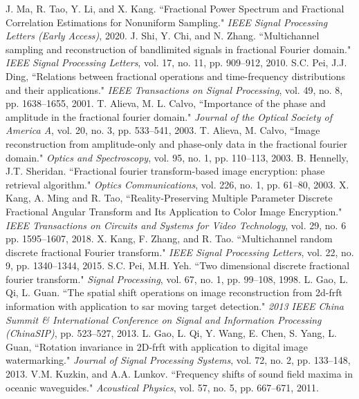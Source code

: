\documentclass[journal]{IEEEtran}
\begin{document}
\begin{thebibliography}{1}
J. Ma, R. Tao, Y. Li, and X. Kang. ``Fractional Power Spectrum and Fractional Correlation Estimations for Nonuniform Sampling." \emph{IEEE Signal Processing Letters (Early Access)}, 2020.
J. Shi, Y. Chi, and N. Zhang. ``Multichannel sampling and reconstruction of bandlimited signals in fractional Fourier domain." \emph{IEEE Signal Processing Letters}, vol. 17, no. 11, pp. 909--912, 2010.
S.C. Pei, J.J. Ding, ``Relations between fractional operations and time-frequency distributions and their applications." \emph{IEEE Transactions on Signal Processing}, vol. 49, no. 8, pp. 1638--1655, 2001.
T. Alieva, M. L. Calvo, ``Importance of the phase and amplitude in the fractional fourier domain." \emph{Journal of the Optical Society of America A}, vol. 20, no. 3, pp. 533--541, 2003.
T. Alieva, M. Calvo, ``Image reconstruction from amplitude-only and phase-only data in the fractional fourier domain." \emph{Optics and Spectroscopy}, vol.  95, no. 1, pp. 110--113, 2003.
B. Hennelly, J.T. Sheridan. ``Fractional fourier transform-based image encryption: phase retrieval algorithm." \emph{Optics Communications}, vol. 226, no. 1, pp. 61--80, 2003.
X. Kang, A. Ming and R. Tao, ``Reality-Preserving Multiple Parameter Discrete Fractional Angular Transform and Its Application to Color Image Encryption." \emph{IEEE Transactions on Circuits and Systems for Video Technology}, vol. 29, no. 6 pp. 1595--1607, 2018.
X. Kang, F. Zhang, and R. Tao. ``Multichannel random discrete fractional Fourier transform." \emph{IEEE Signal Processing Letters}, vol. 22, no. 9, pp. 1340--1344, 2015.
S.C. Pei, M.H. Yeh. ``Two dimensional discrete fractional fourier transform." \emph{Signal Processing}, vol. 67, no. 1, pp. 99--108, 1998.
L. Gao, L. Qi, L. Guan. ``The spatial shift operations on image reconstruction from 2d-frft information with application to sar moving target detection." \emph{2013 IEEE China Summit \& International Conference on Signal and Information Processing (ChinaSIP)}, pp. 523--527, 2013.
L. Gao, L. Qi, Y. Wang, E. Chen, S. Yang, L. Guan, ``Rotation invariance in 2D-frft with application to digital image watermarking." \emph{Journal of Signal Processing Systems}, vol. 72, no. 2, pp. 133--148, 2013.
V.M. Kuzkin, and A.A. Lunkov. ``Frequency shifts of sound field maxima in oceanic waveguides." \emph{Acoustical Physics}, vol. 57, no. 5, pp. 667--671, 2011.

\end{thebibliography}
\end{document}
